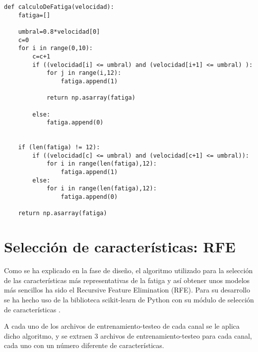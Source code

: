\begin{lstlisting}
def calculoDeFatiga(velocidad):
    fatiga=[]
    
    umbral=0.8*velocidad[0]
    c=0
    for i in range(0,10):
        c=c+1
        if ((velocidad[i] <= umbral) and (velocidad[i+1] <= umbral) ):
            for j in range(i,12):
                fatiga.append(1)
            
            return np.asarray(fatiga)
        
        else:
            fatiga.append(0)
            
        
    if (len(fatiga) != 12):
        if ((velocidad[c] <= umbral) and (velocidad[c+1] <= umbral)):
            for i in range(len(fatiga),12):
                fatiga.append(1)
        else:
            for i in range(len(fatiga),12):
                fatiga.append(0)
    
    return np.asarray(fatiga)
\end{lstlisting}

\section{Selección de características: RFE}
Como se ha explicado en la fase de diseño, el algoritmo utilizado para la selección de las características más representativas de la fatiga y así obtener unos modelos más sencillos ha sido el Recursive Feature Elimination (RFE). Para su desarrollo se ha hecho uso de la biblioteca scikit-learn de Python con su módulo de selección de características \cite{rfecv}.

A cada uno de los archivos de entrenamiento-testeo de cada canal se le aplica dicho algoritmo, y se extraen 3 archivos de entrenamiento-testeo para cada canal, cada uno con un número diferente de características. 


